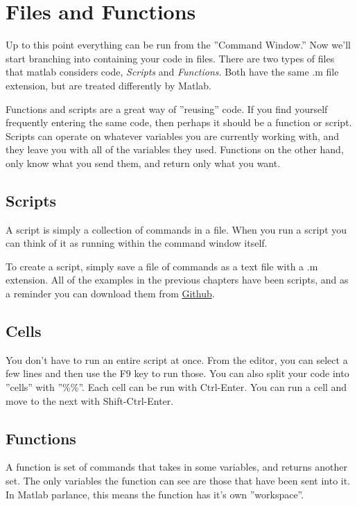 
\section{Files and Functions}
Up to this point everything can be run from the ''Command Window.''
 Now we'll start branching into containing your code in files.
 There are two types of files that matlab considers code, \emph{Scripts} and \emph{Functions}.
 Both have the same .m file extension, but are treated differently by Matlab.
 
Functions and scripts are a great way of ''reusing'' code.
 If you find yourself frequently entering the same code, then perhaps it should be a function or script.
 Scripts can operate on whatever variables you are currently working with, and they leave you with all of the variables they used.
 Functions on the other hand, only know what you send them, and return only what you want.

\subsection{Scripts}
A script is simply a collection of commands in a file.
 When you run a script you can think of it as running within the command window itself.
 
To create a script, simply save a file of commands as a text file with a .m extension.
 All of the examples in the previous chapters have been scripts, and as a reminder you can download them from \href{https://github.com/KEClaytor/QuickDirtyMatlab/tree/master/code}{Github}.

\begin{quote}

\end{quote}

\pagebreak
\subsection{Cells}
You don't have to run an entire script at once.
 From the editor, you can select a few lines and then use the F9 key to run those.
 You can also split your code into ''cells'' with ''\%\%''.
 Each cell can be run with Ctrl-Enter.
 You can run a cell and move to the next with Shift-Ctrl-Enter.

\begin{quote}

\end{quote}

\pagebreak
\subsection{Functions}
A function is set of commands that takes in some variables, and returns another set.
 The only variables the function can see are those that have been sent into it.
 In Matlab parlance, this means the function has it's own ''workspace''.
  
